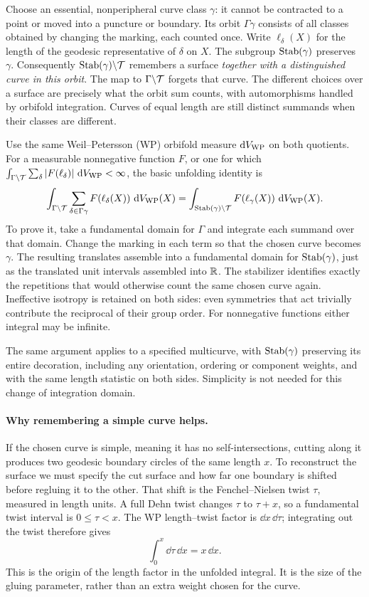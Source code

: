 Choose an essential, nonperipheral curve class $\gamma$: it cannot
be contracted to a point or moved into a puncture or boundary. Its orbit
$\Gamma\gamma$ consists of all classes obtained by changing
the marking, each counted once. Write $\ell_\delta(X)$ for
the length of the geodesic representative of $\delta$ on $X$.
The subgroup $\operatorname{Stab}(\gamma)$ preserves $\gamma$.
Consequently $\operatorname{Stab}(\gamma)\backslash\mathcal T$ remembers a surface
\emph{together with a distinguished curve in this orbit}.
The map to $\Gamma\backslash\mathcal T$ forgets that curve.
The different choices over a surface are precisely what the
orbit sum counts, with automorphisms handled by orbifold
integration. Curves of equal length are still distinct
summands when their classes are different.

Use the same Weil--Petersson (WP) orbifold measure $\mathop{}\!\mathrm d V_{\mathrm{WP}}$ on
both quotients. For a measurable nonnegative function $F$,
or one for which
$\int_{\Gamma\backslash\mathcal T}\sum_\delta|F(\ell_\delta)|\,\mathop{}\!\mathrm d V_{\mathrm{WP}}<\infty$,
the basic unfolding identity is
\begin{equation}
 \int_{\Gamma\backslash\mathcal T}
 \sum_{\delta\in\Gamma\gamma}F(\ell_\delta(X))\,\mathop{}\!\mathrm d V_{\mathrm{WP}}(X)
 =\int_{\operatorname{Stab}(\gamma)\backslash\mathcal T}
             F(\ell_\gamma(X))\,\mathop{}\!\mathrm d V_{\mathrm{WP}}(X).
 \label{eq:unfold}
\end{equation}
To prove it, take a fundamental domain for $\Gamma$ and
integrate each summand over that domain. Change the marking
in each term so that the chosen curve becomes $\gamma$.
The resulting translates assemble into a fundamental domain
for $\operatorname{Stab}(\gamma)$, just as the translated unit intervals
assembled into $\mathbb R$. The stabilizer identifies exactly the
repetitions that would otherwise count the same chosen curve
again. Ineffective isotropy is retained on both sides: even symmetries
that act trivially contribute the reciprocal of their group order.
For nonnegative functions either integral may be infinite.

The same argument applies to a specified multicurve, with
$\operatorname{Stab}(\gamma)$ preserving its entire decoration, including
any orientation, ordering or component weights, and with the
same length statistic on both sides. Simplicity is not needed
for this change of integration domain.

\paragraph{Why remembering a simple curve helps.}
If the chosen curve is simple, meaning it has no self-intersections,
cutting along it produces two
geodesic boundary circles of the same length $x$.
To reconstruct the surface we must specify the cut surface
and how far one boundary is shifted before regluing it to the
other. That shift is the Fenchel--Nielsen twist $\tau$,
measured in length units. A full Dehn twist changes $\tau$
to $\tau+x$, so a fundamental twist interval is $0\le\tau<x$.
The WP length--twist factor is $\dd x\,\dd\tau$; integrating
out the twist therefore gives
\[
 \int_0^x\dd\tau\,\dd x=x\,\dd x.
\]
This is the origin of the length factor in the unfolded
integral. It is the size of the gluing parameter, rather than
an extra weight chosen for the curve.

